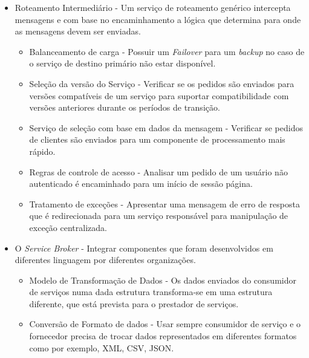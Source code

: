\begin{itemize}

\item Roteamento Intermediário - Um serviço de roteamento genérico intercepta mensagens e com base no encaminhamento a lógica que determina para onde as mensagens devem ser enviadas.

\begin{itemize}

\item Balanceamento de carga - Possuir um \textit{Failover} para um \textit{backup} no caso de o serviço de destino 	primário não estar disponível.

\item{Seleção da versão do Serviço - Verificar se os pedidos são enviados para versões compatíveis de um serviço para     suportar compatibilidade com versões anteriores durante os períodos de transição}.

\item Serviço de seleção com base em dados da mensagem - Verificar se pedidos de clientes são enviados para um componente de processamento mais rápido.

\item Regras de controle de acesso - Analisar um pedido de um usuário não autenticado é encaminhado para um início de sessão página.

\item Tratamento de exceções - Apresentar uma mensagem de erro de resposta que é redirecionada para um serviço responsável para manipulação de exceção centralizada.

\end{itemize}

\item O \textit{Service Broker} - Integrar componentes que foram desenvolvidos em diferentes linguagem por diferentes organizações.

\begin{itemize}

\item Modelo de Transformação de Dados - Os dados enviados do consumidor de serviços numa dada estrutura transforma-se em uma estrutura diferente, que está prevista para o prestador de serviços.

\item Conversão de Formato de dados - Usar sempre consumidor de serviço e o fornecedor precisa de trocar dados representados em diferentes formatos como por exemplo, \acrshort{XML}, \acrshort{CSV}, \acrshort{JSON}.


\end{itemize}
\end{itemize}
